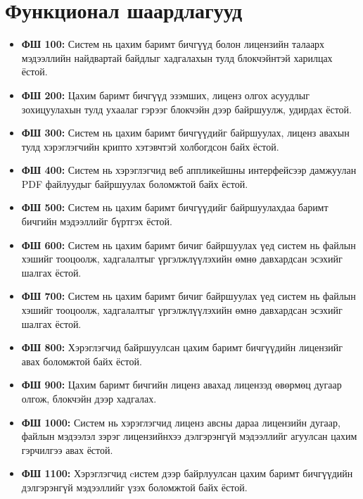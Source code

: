 \section{Функционал шаардлагууд}
\begin{itemize}
      \item \textbf{ФШ 100:} Систем нь цахим баримт бичгүүд болон лицензийн талаарх мэдээллийн найдвартай байдлыг хадгалахын тулд блокчэйнтэй харилцах ёстой.
      \item \textbf{ФШ 200:} Цахим баримт бичгүүд эзэмших, лиценз олгох асуудлыг зохицуулахын тулд ухаалаг гэрээг блокчэйн дээр байршуулж, удирдах ёстой.
      \item \textbf{ФШ 300:} Систем нь цахим баримт бичгүүдийг байршуулах, лиценз авахын тулд  хэрэглэгчийн крипто хэтэвчтэй холбогдсон байх ёстой.
      \item \textbf{ФШ 400:} Систем нь хэрэглэгчид веб аппликейшны интерфейсээр дамжуулан PDF файлуудыг байршуулах боломжтой байх ёстой.
      \item \textbf{ФШ 500:} Систем нь цахим баримт бичгүүдийг байршуулахдаа баримт бичгийн мэдээллийг бүртгэх ёстой.
      \item \textbf{ФШ 600:} Систем нь цахим баримт бичиг байршуулах үед систем нь файлын хэшийг тооцоолж, хадгалалтыг үргэлжлүүлэхийн өмнө давхардсан эсэхийг шалгах ёстой.
      \item \textbf{ФШ 700:} Систем нь цахим баримт бичиг байршуулах үед систем нь файлын хэшийг тооцоолж, хадгалалтыг үргэлжлүүлэхийн өмнө давхардсан эсэхийг шалгах ёстой.
      \item \textbf{ФШ 800:} Хэрэглэгчид байршуулсан цахим баримт бичгүүдийн лицензийг авах боломжтой байх ёстой.
      \item \textbf{ФШ 900:} Цахим баримт бичгийн лиценз авахад лицензэд өвөрмөц дугаар олгож, блокчэйн дээр хадгалах.
      \item \textbf{ФШ 1000:} Систем нь хэрэглэгчид лиценз авсны дараа лицензийн дугаар, файлын мэдээлэл зэрэг лицензийнхээ дэлгэрэнгүй мэдээллийг агуулсан цахим гэрчилгээ авах ёстой.
      \item \textbf{ФШ 1100:} Хэрэглэгчид cистем дээр байрлуулсан цахим баримт бичгүүдийн дэлгэрэнгүй мэдээллийг үзэх боломжтой байх ёстой.
\end{itemize}

